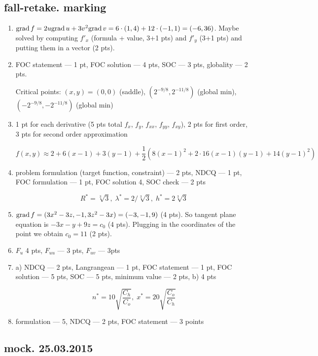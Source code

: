 \subsection{fall-retake. marking}
\begin{enumerate}
\item $\mathrm{grad}\, f =2u \mathrm{grad}\, u + 3v^2 \mathrm{grad}\, v = 6\cdot (1,4)+12\cdot (-1,1)=(-6,36)$. Maybe solved by computing $f'_x$ (formula + value, 3+1 pts) and $f'_y$ (3+1 pts) and putting them in a vector (2 pts).
\item FOC statement --- 1 pt, FOC solution --- 4 pts, SOC --- 3 pts, globality --- 2 pts.

Critical points: $(x,y)=(0,0)$ (saddle), $(2^{-9/8},2^{-11/8})$ (global min), $(-2^{-9/8},-2^{-11/8})$ (global min)

\item 1 pt for each derivative (5 pts total $f_x$, $f_y$, $f_{xx}$, $f_{yy}$, $f_{xy}$), 2 pts for first order, 3 pts for second order approximation

\[
f(x,y)\approx 2 + 6(x-1) + 3(y-1) + \frac{1}{2} (8(x-1)^2 + 2\cdot 16(x-1)(y-1)+14(y-1)^2)
\]

\item problem formulation (target function, constraint) --- 2 pts, NDCQ --- 1 pt, FOC formulation --- 1 pt, FOC solution 4, SOC check --- 2 pts

\[
R^*=\sqrt[3]{3}, \; \lambda^*=2/\sqrt[3]{3}, \; h^*=2\sqrt[3]{3}
\]

\item $\mathrm{grad}\, f = (3x^2-3z,-1,3z^2-3x)=(-3,-1,9)$ (4 pts). So tangent plane equation is $-3x-y+9z=c_0$ (4 pts). Plugging in the coordinates of the point we obtain $c_0=11$ (2 pts).

\item $F_u$ 4 pts, $F_{uu}$ --- 3 pts, $F_{uv}$ --- 3pts

\item a) NDCQ --- 2 pts, Langrangean --- 1 pt,  FOC statement --- 1 pt, FOC solution --- 5 pts, SOC --- 5 pts, minimum value --- 2 pts, b) 4 pts

\[
n^*=10\sqrt{\frac{C_h}{C_o}}, \; x^*=20\sqrt{\frac{C_o}{C_h}}
\]

\item formulation --- 5, NDCQ --- 2 pts, FOC statement --- 3 points

\end{enumerate}

\subsection{mock. 25.03.2015}

